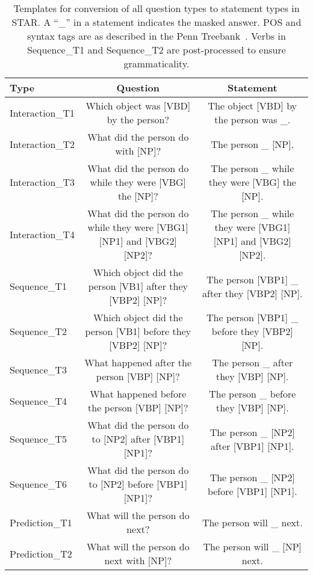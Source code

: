 \begin{landscape}
\begin{table}[htpb]
    \centering
    \caption{Templates for conversion of all question types to statement types
        in STAR. A ``\_'' in a statement indicates the masked answer.  POS and
        syntax tags are as described in the Penn
        Treebank~\cite{marcus1993penntreebank}. Verbs in Sequence\_T1 and
        Sequence\_T2 are post-processed to ensure grammaticality.}
    \label{tab:qs_to_stmts}
    \scriptsize
    \begin{tabular}{lcc}
        \toprule
        Type & Question & Statement \\
        \midrule
        Interaction\_T1 & Which object was [VBD] by the person? & The object [VBD] by the person was \_. \\
        Interaction\_T2 & What did the person do with [NP]? & The person \_ [NP]. \\
        Interaction\_T3 & What did the person do while they were [VBG] the [NP]? & The person \_ while they were [VBG] the [NP]. \\
        Interaction\_T4 & What did the person do while they were [VBG1] [NP1] and [VBG2] [NP2]? & The person \_ while they were [VBG1] [NP1] and [VBG2] [NP2]. \\
        \midrule
        Sequence\_T1 & Which object did the person [VB1] after they [VBP2] [NP]? & The person [VBP1] \_ after they [VBP2] [NP]. \\
        Sequence\_T2 & Which object did the person [VB1] before they [VBP2] [NP]? & The person [VBP1] \_ before they [VBP2] [NP]. \\
        Sequence\_T3 & What happened after the person [VBP] [NP]? & The person \_ after they [VBP] [NP]. \\
        Sequence\_T4 & What happened before the person [VBP] [NP]? & The person \_ before they [VBP] [NP]. \\
        Sequence\_T5 & What did the person do to [NP2] after [VBP1] [NP1]? & The person \_ [NP2] after [VBP1] [NP1]. \\
        Sequence\_T6 & What did the person do to [NP2] before [VBP1] [NP1]? & The person \_ [NP2] before [VBP1] [NP1]. \\
        \midrule
        Prediction\_T1 & What will the person do next? & The person will \_ next. \\
        Prediction\_T2 & What will the person do next with [NP]? & The person will \_ [NP] next. \\

\end{tabular}
\end{table}
\end{landscape}
